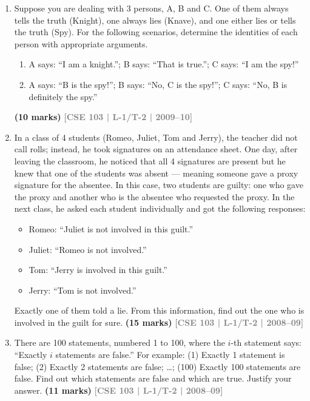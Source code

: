\documentclass[12pt,a3paper]{article}
\newcommand{\yr}[1]{\hfill\textcolor{gray}{\small\textbf{[#1]}}}
\newcommand{\mk}[1]{\textcolor{orange!70!black}{\small\textbf{(#1 marks)}}}
\begin{document}
\begin{enumerate}
\item Suppose you are dealing with 3 persons, A, B and C. One of them always tells the truth (Knight), one always lies (Knave), and one either lies or tells the truth (Spy). For the following scenarios, determine the identities of each person with appropriate arguments.
\begin{enumerate}
  \item A says: ``I am a knight.''; B says: ``That is true.''; C says: ``I am the spy!''
  \item A says: ``B is the spy!''; B says: ``No, C is the spy!''; C says: ``No, B is definitely the spy.''
\end{enumerate}
\mk{10} \yr{CSE 103 | L-1/T-2 | 2009--10}

\item In a class of 4 students (Romeo, Juliet, Tom and Jerry), the teacher did not call rolls; instead, he took signatures on an attendance sheet. One day, after leaving the classroom, he noticed that all 4 signatures are present but he knew that one of the students was absent — meaning someone gave a proxy signature for the absentee. In this case, two students are guilty: one who gave the proxy and another who is the absentee who requested the proxy. In the next class, he asked each student individually and got the following responses:
\begin{itemize}[leftmargin=1.8em,itemsep=2pt,label={$\bullet$}]
  \item Romeo: ``Juliet is not involved in this guilt.''
  \item Juliet: ``Romeo is not involved.''
  \item Tom: ``Jerry is involved in this guilt.''
  \item Jerry: ``Tom is not involved.''
\end{itemize}
Exactly one of them told a lie. From this information, find out the one who is involved in the guilt for sure.
\mk{15} \yr{CSE 103 | L-1/T-2 | 2008--09}

\item There are 100 statements, numbered 1 to 100, where the $i$-th statement says: ``Exactly $i$ statements are false.'' For example: (1) Exactly 1 statement is false; (2) Exactly 2 statements are false; \ldots; (100) Exactly 100 statements are false. Find out which statements are false and which are true. Justify your answer.
\mk{11} \yr{CSE 103 | L-1/T-2 | 2008--09}


\end{enumerate}
\end{document}
